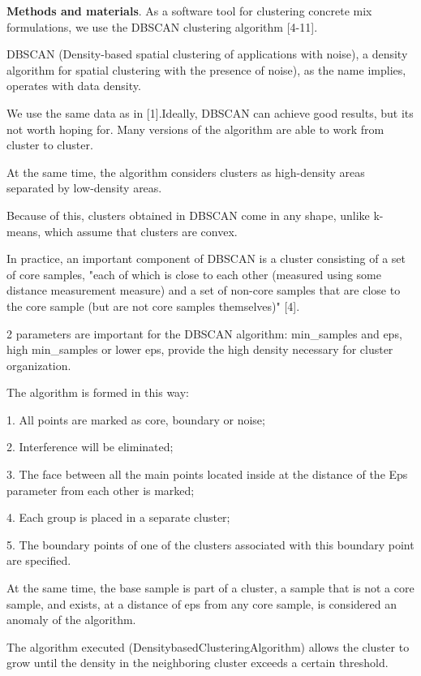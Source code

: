 \begin{multicols}{2}
{\bfseries Methods and materials}. As a software tool for clustering
concrete mix formulations, we use the DBSCAN clustering algorithm
{[}4-11{]}.

DBSCAN (Density-based spatial clustering of applications with noise), a
density algorithm for spatial clustering with the presence of noise), as
the name implies, operates with data density.

We use the same data as in {[}1{]}.Ideally, DBSCAN can achieve good
results, but it\textquotesingle s not worth hoping for. Many versions of
the algorithm are able to work from cluster to cluster.

At the same time, the algorithm considers clusters as high-density areas
separated by low-density areas.

Because of this, clusters obtained in DBSCAN come in any shape, unlike
k-means, which assume that clusters are convex.

In practice, an important component of DBSCAN is a cluster consisting of
a set of core samples, "each of which is close to each other (measured
using some distance measurement measure) and a set of non-core samples
that are close to the core sample (but are not core samples themselves)"
{[}4{]}.

2 parameters are important for the DBSCAN algorithm: min\_samples and
eps, high min\_samples or lower eps, provide the high density necessary
for cluster organization.

The algorithm is formed in this way:

1. All points are marked as core, boundary or noise;

2. Interference will be eliminated;

3. The face between all the main points located inside at the distance
of the Eps parameter from each other is marked;

4. Each group is placed in a separate cluster;

5. The boundary points of one of the clusters associated with this
boundary point are specified.

At the same time, the base sample is part of a cluster, a sample that is
not a core sample, and exists, at a distance of eps from any core
sample, is considered an anomaly of the algorithm.

The algorithm executed (DensitybasedClusteringAlgorithm) allows the
cluster to grow until the density in the neighboring cluster exceeds a
certain threshold.


\end{multicols}
